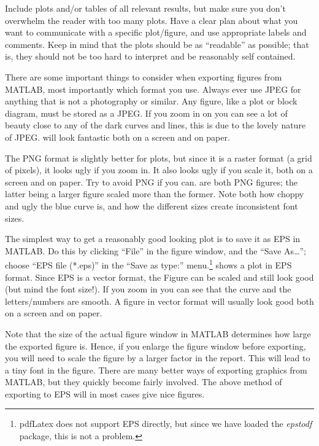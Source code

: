 Include plots and/or tables of all relevant results, but make sure you don't overwhelm the reader with too many plots. Have a clear plan about what you want to communicate with a specific plot/figure, and use appropriate labels and comments. Keep in mind that the plots should be as ``readable'' as possible; that is, they should not be too hard to interpret and be reasonably self contained.

There are some important things to consider when exporting figures from MATLAB, most importantly which format you use. Always ever use JPEG for anything that is not a photography or similar. Any figure, like a plot or block diagram, must be stored as a JPEG\@. If you zoom in on  you can see a lot of beauty close to any of the dark curves and lines, this is due to the lovely nature of JPEG\@.  will look fantastic both on a screen and on paper.

The PNG format is slightly better for plots, but since it is a raster format (a grid of pixels), it looks ugly if you zoom in. It also looks ugly if you scale it, both on a screen and on paper. Try to avoid PNG if you can.  are both PNG figures; the latter being a larger figure scaled more than the former. Note both how choppy and ugly the blue curve is, and how the different sizes create inconsistent font sizes.

The simplest way to get a reasonably good looking plot is to save it as EPS in MATLAB\@. Do this by clicking ``File'' in the figure window, and the ``Save As\ldots''; choose ``EPS file (*.eps)'' in the ``Save as type:'' menu.\footnote{pdfLatex does not support EPS directly, but since we have loaded the \emph{epstodf} package, this is not a problem.}  shows a plot in EPS format. Since EPS is a vector format, the Figure can be scaled and still look good (but mind the font size!). If you zoom in you can see that the curve and the letters/numbers are smooth. A figure in vector format will usually look good both on a screen and on paper.

Note that the size of the actual figure window in MATLAB determines how large the exported figure is. Hence, if you enlarge the figure window before exporting, you will need to scale the figure by a larger factor in the report. This will lead to a tiny font in the figure. There are many better ways of exporting graphics from MATLAB, but they quickly become fairly involved. The above method of exporting to EPS will in most cases give nice figures.

